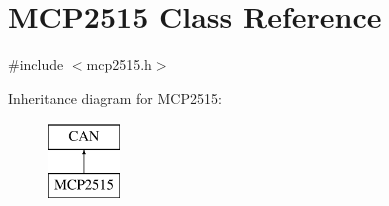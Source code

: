 \hypertarget{class_m_c_p2515}{}\section{M\+C\+P2515 Class Reference}
\label{class_m_c_p2515}


{\ttfamily \#include $<$mcp2515.\+h$>$}

Inheritance diagram for M\+C\+P2515\+:\begin{figure}[H]
\begin{center}
\leavevmode
\includegraphics[height=2.000000cm]{class_m_c_p2515}
\end{center}
\end{figure}
